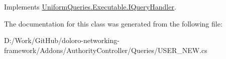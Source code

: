Implements \mbox{\hyperlink{interface_uniform_queries_1_1_executable_1_1_i_query_handler_a0f43184bf3e306a7cbebc39098f044ee}{Uniform\+Queries.\+Executable.\+I\+Query\+Handler}}.



The documentation for this class was generated from the following file\+:\begin{DoxyCompactItemize}
\item 
D\+:/\+Work/\+Git\+Hub/doloro-\/networking-\/framework/\+Addons/\+Authority\+Controller/\+Queries/U\+S\+E\+R\+\_\+\+N\+E\+W.\+cs\end{DoxyCompactItemize}
